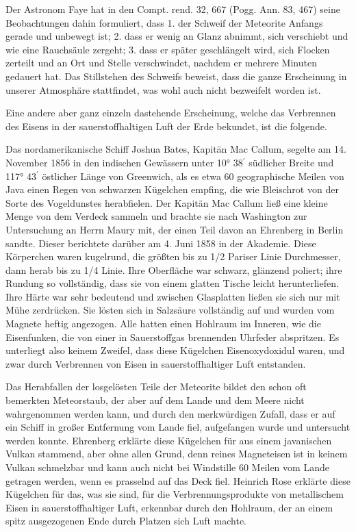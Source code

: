 \documentclass[a4paper, 11pt, oneside, german]{article}
\begin{document}
Der Astronom Faye hat in den Compt. rend. 32, 667 (Pogg. Ann. 83, 467) seine Beobachtungen dahin formuliert, dass 1. der Schweif der Meteorite Anfangs gerade und unbewegt ist; 2. dass er wenig an Glanz abnimmt, sich verschiebt und wie eine Rauchsäule zergeht; 3. dass er später geschlängelt wird, sich Flocken zerteilt und an Ort und Stelle verschwindet, nachdem er mehrere Minuten gedauert hat. Das Stillstehen des Schweifs beweist, dass die ganze Erscheinung in unserer Atmosphäre stattfindet, was wohl auch nicht bezweifelt worden ist.

Eine andere aber ganz einzeln dastehende Erscheinung, welche das Verbrennen des Eisens in der sauerstoffhaltigen Luft der Erde bekundet, ist die folgende.

Das nordamerikanische Schiff Joshua Bates, Kapitän Mac Callum, segelte am 14. November 1856 in den indischen Gewässern unter 10° 38$^{\prime}$ südlicher Breite und 117° 43$^{\prime}$ östlicher Länge von Greenwich, als es etwa 60 geographische Meilen von Java einen Regen von schwarzen Kügelchen empfing, die wie Bleischrot von der Sorte des Vogeldunstes herabfielen. Der Kapitän Mac Callum ließ eine kleine Menge von dem Verdeck sammeln und brachte sie nach Washington zur Untersuchung an Herrn Maury mit, der einen Teil davon an Ehrenberg in Berlin sandte. Dieser berichtete darüber am 4. Juni 1858 in der Akademie. Diese Körperchen waren kugelrund, die größten bis zu 1/2 Pariser Linie Durchmesser, dann herab bis zu 1/4 Linie. Ihre Oberfläche war schwarz, glänzend poliert; ihre Rundung so vollständig, dass sie von einem glatten Tische leicht herunterliefen. Ihre Härte war sehr bedeutend und zwischen Glasplatten ließen sie sich nur mit Mühe zerdrücken. Sie lösten sich in Salzsäure vollständig auf und wurden vom Magnete heftig angezogen. Alle hatten einen Hohlraum im Inneren, wie die Eisenfunken, die von einer in Sauerstoffgas brennenden Uhrfeder abspritzen. Es unterliegt also keinem Zweifel, dass diese Kügelchen Eisenoxydoxidul waren, und zwar durch Verbrennen von Eisen in sauerstoffhaltiger Luft entstanden.

Das Herabfallen der losgelösten Teile der Meteorite bildet den schon oft bemerkten Meteorstaub, der aber auf dem Lande und dem Meere nicht wahrgenommen werden kann, und durch den merkwürdigen Zufall, dass er auf ein Schiff in großer Entfernung vom Lande fiel, aufgefangen wurde und untersucht werden konnte. Ehrenberg erklärte diese Kügelchen für aus einem javanischen Vulkan stammend, aber ohne allen Grund, denn reines Magneteisen ist in keinem Vulkan schmelzbar und kann auch nicht bei Windstille 60 Meilen vom Lande getragen werden, wenn es prasselnd auf das Deck fiel. Heinrich Rose erklärte diese Kügelchen für das, was sie sind, für die Verbrennungsprodukte von metallischem Eisen in sauerstoffhaltiger Luft, erkennbar durch den Hohlraum, der an einem spitz ausgezogenen Ende durch Platzen sich Luft machte.
\end{document}
